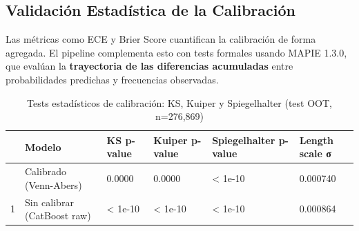 \documentclass[
  spanish,
  11pt,
  letterpaper,
]{scrbook}
\theoremstyle{plain}
\theoremstyle{remark}
\begin{document}
\subsection{Validación Estadística de la
Calibración}\label{validaciuxf3n-estaduxedstica-de-la-calibraciuxf3n}

Las métricas como ECE y Brier Score cuantifican la calibración de forma
agregada. El pipeline complementa esto con tests formales usando MAPIE
1.3.0, que evalúan la \textbf{trayectoria de las diferencias acumuladas}
entre probabilidades predichas y frecuencias observadas.

{

\begin{longtable}[]{@{}llllll@{}}

\caption{\label{tbl-calibration-stat-tests}Tests estadísticos de
calibración: KS, Kuiper y Spiegelhalter (test OOT, n=276,869)}

\tabularnewline

\toprule\noalign{}
& Modelo & KS p-value & Kuiper p-value & Spiegelhalter p-value & Length
scale σ \\
\midrule\noalign{}
\endhead
\bottomrule\noalign{}
\endlastfoot
0 & Calibrado (Venn-Abers) & 0.0000 & 0.0000 & \textless{} 1e-10 &
0.000740 \\
1 & Sin calibrar (CatBoost raw) & \textless{} 1e-10 & \textless{} 1e-10
& \textless{} 1e-10 & 0.000864 \\

\end{longtable}

}
\end{document}
